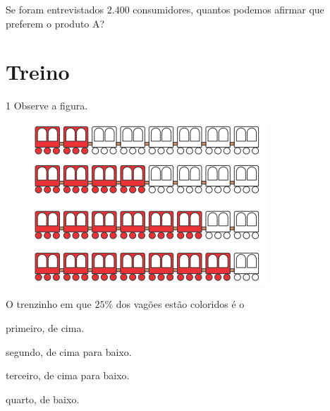 {{{{Se foram entrevistados $2.400$ consumidores, quantos podemos afirmar que preferem o produto A?


\section*{Treino}

\num{1} Observe a figura.

\begin{figure}[H]
\centering\includegraphics[width=3.46528in,height=2.38403in]{./imgSAEB_6_MAT/media/image89.png}
\end{figure}

O trenzinho em que $25\%$ dos vagões estão coloridos é o

\begin{escolha}
\item primeiro, de cima.
\item segundo, de cima para baixo.
\item terceiro, de cima para baixo.
\item quarto, de baixo.
\end{escolha}



}}}}
